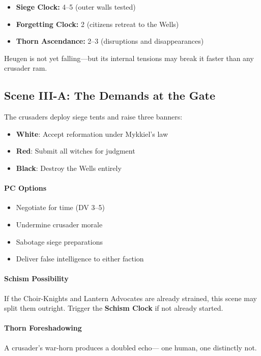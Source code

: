 \documentclass[11pt]{book}
\begin{document}
\begin{itemize}[leftmargin=*]
    \item \textbf{Siege Clock:} 4--5 (outer walls tested)
    \item \textbf{Forgetting Clock:} 2 (citizens retreat to the Wells)
    \item \textbf{Thorn Ascendance:} 2--3 (disruptions and disappearances)
\end{itemize}

\noindent
Heugen is not yet falling---but its internal tensions may break it faster
than any crusader ram.

\subsection*{Scene III-A: The Demands at the Gate}

The crusaders deploy siege tents and raise three banners:
\begin{itemize}
    \item \textbf{White}: Accept reformation under Mykkiel's law
    \item \textbf{Red}: Submit all witches for judgment
    \item \textbf{Black}: Destroy the Wells entirely
\end{itemize}

\paragraph{PC Options}
\begin{itemize}[leftmargin=*]
    \item Negotiate for time (DV 3--5)
    \item Undermine crusader morale
    \item Sabotage siege preparations
    \item Deliver false intelligence to either faction
\end{itemize}

\paragraph{Schism Possibility}
If the Choir-Knights and Lantern Advocates are already strained,
this scene may split them outright.  
Trigger the \textbf{Schism Clock} if not already started.

\paragraph{Thorn Foreshadowing}
A crusader's war-horn produces a doubled echo---  
one human, one distinctly not.
\end{document}
